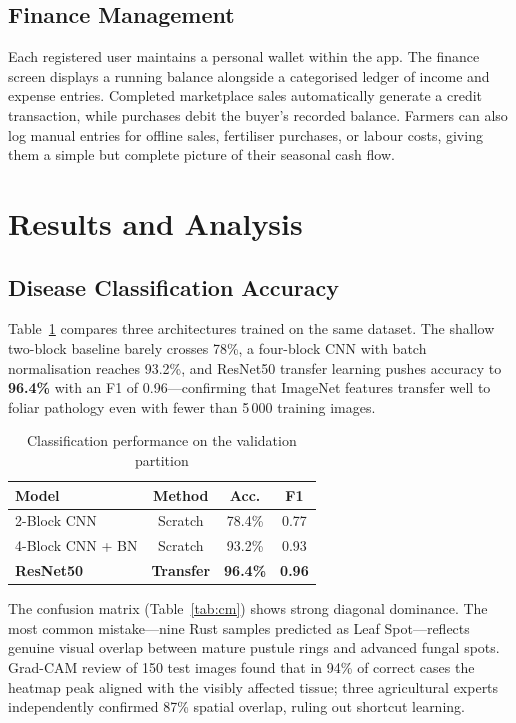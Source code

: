\documentclass[conference]{IEEEtran}
\begin{document}
\subsection{Finance Management}
Each registered user maintains a personal wallet within the app.
The finance screen displays a running balance alongside a categorised
ledger of income and expense entries. Completed marketplace sales
automatically generate a credit transaction, while purchases debit
the buyer's recorded balance. Farmers can also log manual entries
for offline sales, fertiliser purchases, or labour costs, giving
them a simple but complete picture of their seasonal cash flow.

\section{Results and Analysis}

\subsection{Disease Classification Accuracy}
Table~\ref{tab:cmp} compares three architectures
trained on the same dataset. The shallow two-block baseline barely crosses 78\%, a four-block CNN
with batch normalisation reaches 93.2\%, and ResNet50 transfer learning pushes accuracy to
\textbf{96.4\%} with an F1 of 0.96---confirming that ImageNet features transfer well to foliar
pathology even with fewer than 5\,000 training images.

\begin{table}[t]
\centering \caption{Classification performance on the validation partition} \label{tab:cmp}
\begin{tabular}{lccc}
\toprule
\textbf{Model} & \textbf{Method} & \textbf{Acc.} & \textbf{F1} \\
\midrule
2-Block CNN         & Scratch  & 78.4\% & 0.77 \\
4-Block CNN + BN    & Scratch  & 93.2\% & 0.93 \\
\textbf{ResNet50}   & \textbf{Transfer} & \textbf{96.4\%} & \textbf{0.96} \\
\bottomrule
\end{tabular}
\end{table}

The confusion matrix (Table~\ref{tab:cm}) shows strong diagonal dominance. The most common
mistake---nine Rust samples predicted as Leaf Spot---reflects genuine visual overlap between mature
pustule rings and advanced fungal spots. Grad-CAM review of 150 test images found that in 94\% of
correct cases the heatmap peak aligned with the visibly affected tissue; three agricultural experts
independently confirmed 87\% spatial overlap, ruling out shortcut learning.
\end{document}
